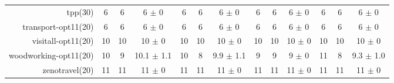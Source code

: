 \begin{center}
\begin{tabular}{|r|*{4}{ccc|}}
tpp(30) & 6 & 6 & 6 \(\pm\) 0 & 6 & 6 & 6 \(\pm\) 0 & 6 & 6 & 6 \(\pm\) 0 & 6 & 6 & 6 \(\pm\) 0\\
transport-opt11(20) & 6 & 6 & 6 \(\pm\) 0 & 6 & 6 & 6 \(\pm\) 0 & 6 & 6 & 6 \(\pm\) 0 & 6 & 6 & 6 \(\pm\) 0\\
visitall-opt11(20) & 10 & 10 & 10 \(\pm\) 0 & 10 & 10 & 10 \(\pm\) 0 & 10 & 10 & 10 \(\pm\) 0 & 10 & 10 & 10 \(\pm\) 0\\
woodworking-opt11(20) & 10 & 9 & 10.1 \(\pm\) 1.1 & 10 & 8 & 9.9 \(\pm\) 1.1 & 9 & 9 & 9 \(\pm\) 0 & 11 & 8 & 9.3 \(\pm\) 1.0\\
zenotravel(20) & 11 & 11 & 11 \(\pm\) 0 & 11 & 11 & 11 \(\pm\) 0 & 11 & 11 & 11 \(\pm\) 0 & 11 & 11 & 11 \(\pm\) 0\\
\end{tabular}
\end{center}

